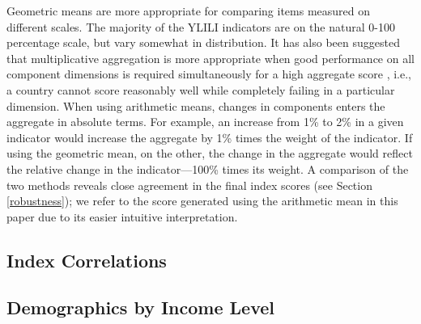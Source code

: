 \documentclass[
  a4paper, twoside, 12pt]{book}
\begin{document}
Geometric means are more appropriate for comparing items measured on different scales. The majority of the YLILI indicators are on the natural 0-100 percentage scale, but vary somewhat in distribution. It has also been suggested that multiplicative aggregation is more appropriate when good performance on all component dimensions is required simultaneously for a high aggregate score \autocite{sagar1998}, i.e., a country cannot score reasonably well while completely failing in a particular dimension. When using arithmetic means, changes in components enters the aggregate in absolute terms. For example, an increase from 1\% to 2\% in a given indicator would increase the aggregate by 1\% times the weight of the indicator. If using the geometric mean, on the other, the change in the aggregate would reflect the relative change in the indicator---100\% times its weight. A comparison of the two methods reveals close agreement in the final index scores (see Section \ref{robustness}); we refer to the score generated using the arithmetic mean in this paper due to its easier intuitive interpretation.

\hypertarget{correlations}{%
\subsection*{Index Correlations}\label{correlations}}


\newpage

\hypertarget{demographics}{%
\subsection*{Demographics by Income Level}\label{demographics}}
\end{document}
